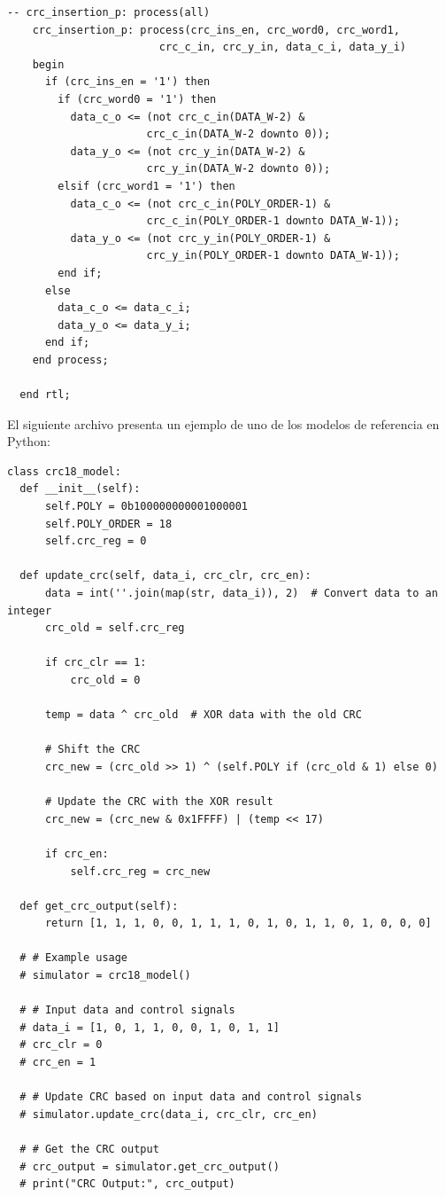 \begin{lstlisting}[caption= "Módulo VHDL de ejemplo"]
    -- crc_insertion_p: process(all)
    crc_insertion_p: process(crc_ins_en, crc_word0, crc_word1,
                        crc_c_in, crc_y_in, data_c_i, data_y_i)
    begin
      if (crc_ins_en = '1') then
        if (crc_word0 = '1') then
          data_c_o <= (not crc_c_in(DATA_W-2) &
                      crc_c_in(DATA_W-2 downto 0));
          data_y_o <= (not crc_y_in(DATA_W-2) &
                      crc_y_in(DATA_W-2 downto 0));
        elsif (crc_word1 = '1') then
          data_c_o <= (not crc_c_in(POLY_ORDER-1) &
                      crc_c_in(POLY_ORDER-1 downto DATA_W-1));
          data_y_o <= (not crc_y_in(POLY_ORDER-1) &
                      crc_y_in(POLY_ORDER-1 downto DATA_W-1));
        end if;
      else
        data_c_o <= data_c_i;
        data_y_o <= data_y_i;
      end if;
    end process;

  end rtl;
\end{lstlisting}

El siguiente archivo presenta un ejemplo de uno de los modelos de referencia en Python:


\begin{lstlisting}[caption= "Modelo en Python de ejemplo"]
  class crc18_model:
  def __init__(self):
      self.POLY = 0b100000000001000001
      self.POLY_ORDER = 18
      self.crc_reg = 0

  def update_crc(self, data_i, crc_clr, crc_en):
      data = int(''.join(map(str, data_i)), 2)  # Convert data to an integer
      crc_old = self.crc_reg

      if crc_clr == 1:
          crc_old = 0

      temp = data ^ crc_old  # XOR data with the old CRC

      # Shift the CRC
      crc_new = (crc_old >> 1) ^ (self.POLY if (crc_old & 1) else 0)

      # Update the CRC with the XOR result
      crc_new = (crc_new & 0x1FFFF) | (temp << 17)

      if crc_en:
          self.crc_reg = crc_new

  def get_crc_output(self):
      return [1, 1, 1, 0, 0, 1, 1, 1, 0, 1, 0, 1, 1, 0, 1, 0, 0, 0]

  # # Example usage
  # simulator = crc18_model()

  # # Input data and control signals
  # data_i = [1, 0, 1, 1, 0, 0, 1, 0, 1, 1]
  # crc_clr = 0
  # crc_en = 1

  # # Update CRC based on input data and control signals
  # simulator.update_crc(data_i, crc_clr, crc_en)

  # # Get the CRC output
  # crc_output = simulator.get_crc_output()
  # print("CRC Output:", crc_output)
\end{lstlisting}

